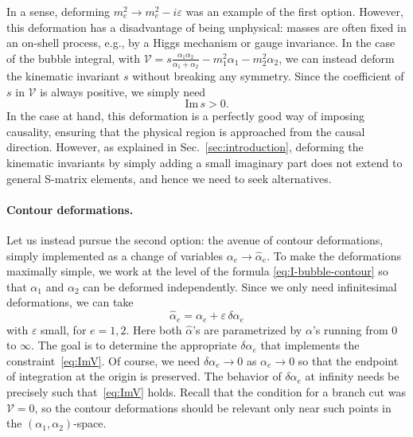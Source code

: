 \documentclass[12pt]{article}
\numberwithin{figure}{section}
\def \be {\begin{equation}}
\def \ee {\end{equation}}
\def \eps {\varepsilon}
\def \V {\mathcal{V}}
\def \Im {\mathrm{Im}}
\begin{document}
	In a sense, deforming $m_e^2 \to m_e^2 - i\eps$ was an example of the first option. However, this deformation has a disadvantage of being unphysical: masses are often fixed in an on-shell process, e.g., by a Higgs mechanism or gauge invariance. In the case of the bubble integral, with $\V = s \frac{\alpha_1 \alpha_2}{\alpha_1+\alpha_2} -m_1^2 \alpha_1 - m_2^2 \alpha_2$, we can instead deform the kinematic invariant $s$ without breaking any symmetry. Since the coefficient of $s$ in $\V$ is always positive, we simply need
	\be
	\Im\, s > 0.
	\ee
	In the case at hand, this deformation is a perfectly good way of imposing causality, ensuring that the physical region is approached from the causal direction. However, as explained in Sec.~\ref{sec:introduction}, deforming the kinematic invariants by simply adding a small imaginary part does not extend to general S-matrix elements, and hence we need to seek alternatives.
	
	\paragraph{Contour deformations.} Let us instead pursue the second option: the avenue of contour deformations, simply implemented as a change of variables $\alpha_e \to \hat{\alpha}_e$. To make the deformations maximally simple, we work at the level of the formula \eqref{eq:I-bubble-contour} so that $\alpha_1$ and $\alpha_2$ can be deformed independently. Since we only need infinitesimal deformations, we can take
	\be
	\hat{\alpha}_e = \alpha_e + \eps\, \delta \alpha_e
	\ee
	with $\eps$ small, for $e=1,2$. Here both $\hat{\alpha}$'s are parametrized by $\alpha$'s running from $0$ to $\infty$.
	The goal is to determine the appropriate $\delta \alpha_e$ that implements the constraint~\eqref{eq:ImV}. Of course, we need $\delta\alpha_e \to 0$ as $\alpha_e \to 0$ so that the endpoint of integration at the origin is preserved. The behavior of $\delta\alpha_e$ at infinity needs be precisely such that~\eqref{eq:ImV} holds. Recall that the condition for a branch cut was $\V = 0$, so the contour deformations should be relevant only near such points in the $(\alpha_1, \alpha_2)$-space.
	
\end{document}

